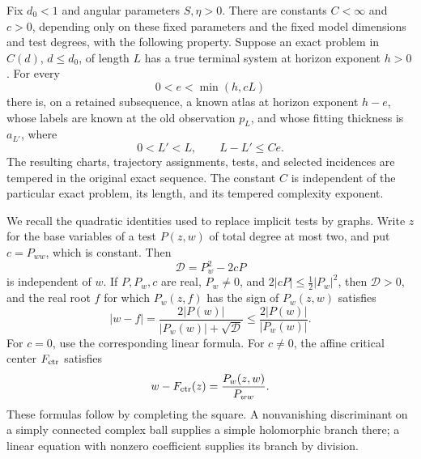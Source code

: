 \begin{lemma}
\label{lem:terminal-extension}
Fix \(d_0<1\) and angular parameters \(S,\eta>0\).
There are constants \(C<\infty\) and \(c>0\), depending only on
these fixed parameters and the fixed model dimensions and test
degrees, with the following property. Suppose an exact problem in
\(C(d)\), \(d\le d_0\), of length \(L\) has a true terminal system
at horizon exponent \(h>0\). For every
\[
 0<e<\min(h,cL)
\]
there is, on a retained subsequence, a known atlas at horizon
exponent \(h-e\), whose labels are known at the old observation
\(p_L\), and whose fitting thickness is \(a_{L'}\), where
\[
 0<L'<L,\qquad L-L'\le Ce.
\]
The resulting charts, trajectory assignments, tests, and selected
incidences are tempered in the original exact sequence. The
constant \(C\) is independent of the particular exact problem,
its length, and its tempered complexity exponent.
\end{lemma}

We recall the quadratic identities used to replace implicit tests by
graphs. Write \(z\) for the base variables of a test \(P(z,w)\)
of total degree at most two, and put \(c=P_{ww}\), which is constant.
Then
\[
 \mathcal D=P_w^2-2cP
\]
is independent of \(w\). If \(P,P_w,c\) are real, \(P_w\ne0\), and
\(2|cP|\le\frac12|P_w|^2\), then \(\mathcal D>0\), and the
real root \(f\) for which \(P_w(z,f)\) has the sign of
\(P_w(z,w)\) satisfies
\begin{equation}
 |w-f|
 =\frac{2|P(w)|}{|P_w(w)|+\sqrt{\mathcal D}}
 \le\frac{2|P(w)|}{|P_w(w)|}.
 \label{a02:nearest-quadratic-root}
\end{equation}
For \(c=0\), use the corresponding linear formula. For \(c\ne0\),
the affine critical center \(F_{\rm ctr}\) satisfies
\begin{equation}
 w-F_{\rm ctr}(z)=\frac{P_w(z,w)}{P_{ww}}.
 \label{a02:critical-center}
\end{equation}
These formulas follow by completing the square. A nonvanishing
discriminant on a simply connected complex ball supplies a simple
holomorphic branch there; a linear equation with nonzero coefficient
supplies its branch by division.

